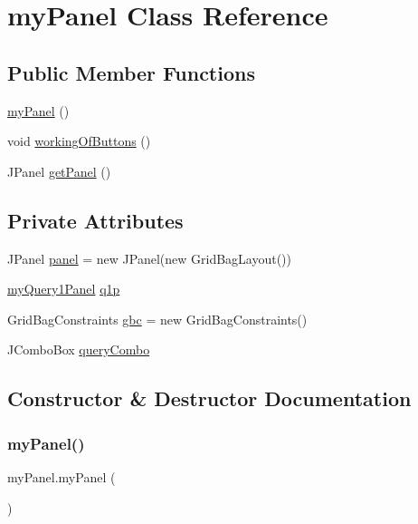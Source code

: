 \hypertarget{classmy_panel}{}\section{my\+Panel Class Reference}
\label{classmy_panel}
\subsection*{Public Member Functions}
\begin{DoxyCompactItemize}
\item 
\hyperlink{classmy_panel_ab3caf63718b52c0f771983dc83b2d950}{my\+Panel} ()
\item 
void \hyperlink{classmy_panel_ac67bebd824b15236aa5213673cd49c88}{working\+Of\+Buttons} ()
\item 
J\+Panel \hyperlink{classmy_panel_a259592e52478c99ae70c9e962ad17236}{get\+Panel} ()
\end{DoxyCompactItemize}
\subsection*{Private Attributes}
\begin{DoxyCompactItemize}
\item 
J\+Panel \hyperlink{classmy_panel_a1c490278eaeddcb1dae9467a00273649}{panel} = new J\+Panel(new Grid\+Bag\+Layout())
\item 
\hyperlink{classmy_query1_panel}{my\+Query1\+Panel} \hyperlink{classmy_panel_ac348cee6b7813ba64232d00d6ced4e32}{q1p}
\item 
Grid\+Bag\+Constraints \hyperlink{classmy_panel_ac5085bb42695859a6e335cc034eabe1e}{gbc} = new Grid\+Bag\+Constraints()
\item 
J\+Combo\+Box \hyperlink{classmy_panel_a813f1c40dfebaf8ba021a08f7cc224e6}{query\+Combo}
\end{DoxyCompactItemize}


\subsection{Constructor \& Destructor Documentation}
\hypertarget{classmy_panel_ab3caf63718b52c0f771983dc83b2d950}{}\label{classmy_panel_ab3caf63718b52c0f771983dc83b2d950} 
\subsubsection{\texorpdfstring{my\+Panel()}{myPanel()}}
{\footnotesize\ttfamily my\+Panel.\+my\+Panel (\begin{DoxyParamCaption}{ }\end{DoxyParamCaption})}




